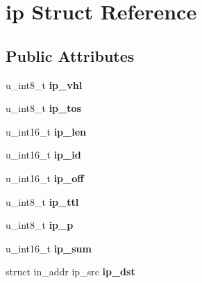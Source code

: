 \hypertarget{structip}{
\section{ip Struct Reference}
\label{structip}
}
\subsection*{Public Attributes}
\begin{DoxyCompactItemize}
\item 
\hypertarget{structip_affef495d8615f4b19324234cf5d9bfbc}{
u\_\-int8\_\-t {\bfseries ip\_\-vhl}}
\label{structip_affef495d8615f4b19324234cf5d9bfbc}

\item 
\hypertarget{structip_a0c063ac560b8b05beec12739f9b7ffd4}{
u\_\-int8\_\-t {\bfseries ip\_\-tos}}
\label{structip_a0c063ac560b8b05beec12739f9b7ffd4}

\item 
\hypertarget{structip_a68f46ed19957f1b9c3c3d4bf0b7629b8}{
u\_\-int16\_\-t {\bfseries ip\_\-len}}
\label{structip_a68f46ed19957f1b9c3c3d4bf0b7629b8}

\item 
\hypertarget{structip_a803b7c386146df5ed9ab287bf7c1cc83}{
u\_\-int16\_\-t {\bfseries ip\_\-id}}
\label{structip_a803b7c386146df5ed9ab287bf7c1cc83}

\item 
\hypertarget{structip_a7069f100940baf9dd4108074aafa4d2c}{
u\_\-int16\_\-t {\bfseries ip\_\-off}}
\label{structip_a7069f100940baf9dd4108074aafa4d2c}

\item 
\hypertarget{structip_aec75b95b1d8d3b93273e4220bd2e5556}{
u\_\-int8\_\-t {\bfseries ip\_\-ttl}}
\label{structip_aec75b95b1d8d3b93273e4220bd2e5556}

\item 
\hypertarget{structip_a5e91d4d2a7ae243f37e4297b0dc795a9}{
u\_\-int8\_\-t {\bfseries ip\_\-p}}
\label{structip_a5e91d4d2a7ae243f37e4297b0dc795a9}

\item 
\hypertarget{structip_a83657b9f77655ad6818361d3ce3644aa}{
u\_\-int16\_\-t {\bfseries ip\_\-sum}}
\label{structip_a83657b9f77655ad6818361d3ce3644aa}

\item 
\hypertarget{structip_a68892eac9dc7a7e27aef51358f93324f}{
struct in\_\-addr ip\_\-src {\bfseries ip\_\-dst}}
\label{structip_a68892eac9dc7a7e27aef51358f93324f}


\end{DoxyCompactItemize}
